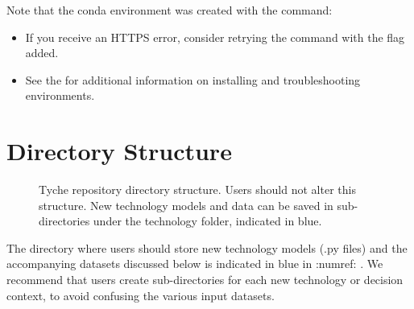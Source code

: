 \documentclass[letterpaper,10pt,english]{sphinxmanual}
\let\sphinxpxdimen\pdfpxdimen\else\newdimen\sphinxpxdimen
\begin{document}
Note that the conda environment was created with the command:

\begin{sphinxVerbatim}[commandchars=\\\{\}]
              
\end{sphinxVerbatim}
\begin{itemize}
\item {} 
If you receive an HTTPS error, consider retrying the command with the  flag added.

\item {} 
See the  for additional information on installing and troubleshooting environments.

\end{itemize}


\section{Directory Structure}
\label{\detokenize{cheat-sheet:directory-structure}}
\begin{figure}[htbp]
\centering
\capstart

\noindent\sphinxincludegraphics[width=400\sphinxpxdimen]{{image1}.png}
\caption{Tyche repository directory structure. Users should not alter this structure. New technology models and data can be saved in sub-directories under the technology folder, indicated in blue.}\label{\detokenize{cheat-sheet:figure-1}}\label{\detokenize{cheat-sheet:fig-directorystruct}}\end{figure}

The directory where users should store new technology models (.py files) and the accompanying datasets discussed below is indicated in blue in :numref: . We recommend that users create sub-directories for each new technology or decision context, to avoid confusing the various input datasets.
\end{document}
